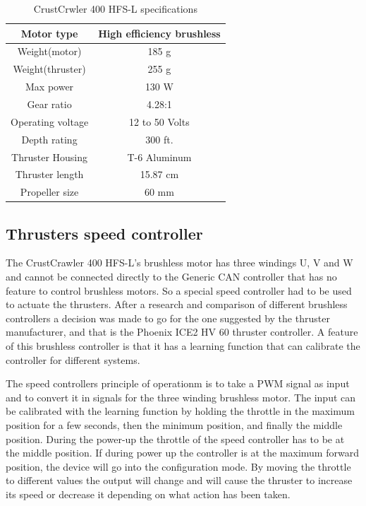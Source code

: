 \begin{table}[h]
\centering
    \caption{CrustCrwler 400 HFS-L specifications}
    \begin{tabular}{|c|c|} \hline
    \label{table:one_column}
       Motor type    &  High efficiency brushless \\ \hline
       Weight(motor) & 185 g \\ \hline
         Weight(thruster) & 255 g \\ \hline
           Max power &  130 W \\ \hline
             Gear ratio & 4.28:1 \\ \hline
               Operating voltage & 12 to 50 Volts \\ \hline
                 Depth rating  & 300 ft. \\ \hline
                   Thruster Housing & T-6 Aluminum \\ \hline
                     Thruster length & 15.87 cm \\ \hline  
                      Propeller size & 60 mm \\ \hline
     
    \end{tabular}
\end{table}
 
\subsection{Thrusters speed controller}
The CrustCrawler 400 HFS-L's brushless motor has three windings U, V and W and cannot be connected directly to the Generic CAN controller that has no feature to control brushless motors. So a special speed controller had to be used to actuate the thrusters. After a research and comparison of different brushless controllers a decision was made to go for the one suggested by the thruster manufacturer, and that is the Phoenix ICE2 HV 60 thruster controller. A feature of this brushless controller is that it has a learning function that can calibrate the controller for different systems. 

The speed controllers principle of operationm is to take a PWM signal as input and to convert it in signals for the three winding brushless motor. The input can be calibrated with the learning function by holding the throttle in the maximum position  for a few seconds, then  the minimum position, and finally the middle position. During the power-up the throttle of the speed controller has to be at the middle position. If during power up  the controller is at the maximum forward position, the device will  go into the configuration mode. By moving the throttle to different values the output will change and will cause the thruster to increase its speed or decrease it depending on what action has been taken. 
